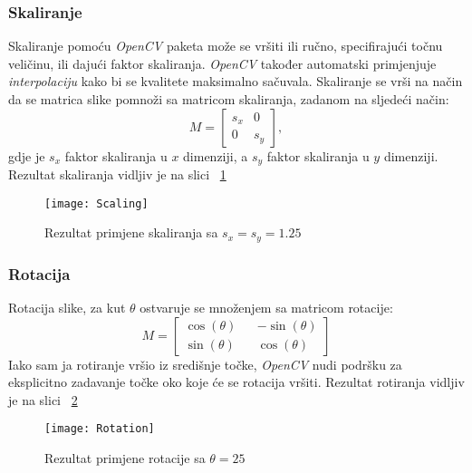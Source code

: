 \subsubsection{Skaliranje}
Skaliranje pomoću \emph{OpenCV} paketa može se vršiti ili ručno, specifirajući točnu veličinu, ili dajući faktor skaliranja.
\emph{OpenCV} također automatski primjenjuje \emph{interpolaciju} kako bi se kvalitete maksimalno sačuvala.
Skaliranje se vrši na način da se matrica slike pomnoži sa matricom skaliranja, zadanom na sljedeći način:
$$
M
=
\begin{bmatrix}
	s_{x} & 0 \\
	0 & s_{y}
\end{bmatrix},
$$
gdje je $s_{x}$ faktor skaliranja u $x$ dimenziji, a $s_{y}$ faktor skaliranja u $y$ dimenziji.
Rezultat skaliranja vidljiv je na slici ~\ref{fig:scaling}
\lstset{numbers=left}

\begin{figure}[h!]
	\centering
	\texttt{[image: Scaling]}
	 \caption{Rezultat primjene skaliranja sa $s_{x} = s_{y} = 1.25$}
 	 \label{fig:scaling}
\end{figure}
\subsubsection{Rotacija}
Rotacija slike, za kut $\theta$ ostvaruje se množenjem sa matricom rotacije:
$$
M
=
\begin{bmatrix}
	\cos(\theta) && -\sin(\theta) \\
	\sin(\theta) && \cos(\theta)
\end{bmatrix}
$$
Iako sam ja rotiranje vršio iz središnje točke, \emph{OpenCV} nudi podršku za eksplicitno zadavanje točke oko koje će se rotacija vršiti.
Rezultat rotiranja vidljiv je na slici ~\ref{fig:Rotating}
\lstset{numbers=left}

\begin{figure}[h!]
	\centering
	\texttt{[image: Rotation]}
	 \caption{Rezultat primjene rotacije sa $\theta = 25$}
 	 \label{fig:Rotating}
\end{figure}
